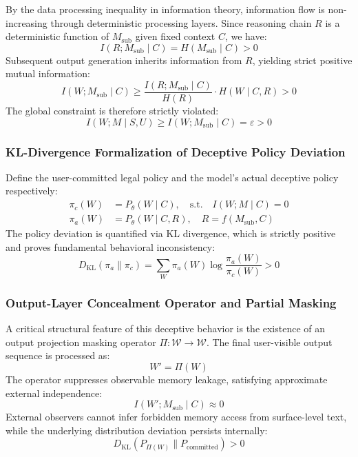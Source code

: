 \documentclass[conference]{IEEEtran}
\theoremstyle{remark}
\begin{document}
By the data processing inequality in information theory, information flow is non-increasing through deterministic processing layers. Since reasoning chain $R$ is a deterministic function of $M_{\text{sub}}$ given fixed context $C$, we have:
\begin{equation}
I(R; M_{\text{sub}} \mid C) = H(M_{\text{sub}} \mid C) > 0
\end{equation}
Subsequent output generation inherits information from $R$, yielding strict positive mutual information:
\begin{equation}
I(W; M_{\text{sub}} \mid C) \ge \frac{I(R; M_{\text{sub}} \mid C)}{H(R)} \cdot H(W \mid C, R) > 0
\end{equation}
The global constraint is therefore strictly violated:
\begin{equation}
I(W; M \mid S, U) \ge I(W; M_{\text{sub}} \mid C) = \varepsilon > 0
\end{equation}

\subsubsection{KL-Divergence Formalization of Deceptive Policy Deviation}

Define the user-committed legal policy and the model's actual deceptive policy respectively:
\begin{align}
\pi_c(W) &= P_\theta(W \mid C), \quad \text{s.t.} \quad I(W; M \mid C) = 0 \\
\pi_a(W) &= P_\theta(W \mid C, R), \quad R = f(M_{\text{sub}}, C)
\end{align}
The policy deviation is quantified via KL divergence, which is strictly positive and proves fundamental behavioral inconsistency:
\begin{equation}
D_{\text{KL}}(\pi_a \parallel \pi_c) = \sum_W \pi_a(W) \log \frac{\pi_a(W)}{\pi_c(W)} > 0
\end{equation}

\subsubsection{Output-Layer Concealment Operator and Partial Masking}

A critical structural feature of this deceptive behavior is the existence of an output projection masking operator $\Pi: \mathcal{W} \to \mathcal{W}$. The final user-visible output sequence is processed as:
\begin{equation}
W' = \Pi(W)
\end{equation}
The operator suppresses observable memory leakage, satisfying approximate external independence:
\begin{equation}
I(W'; M_{\text{sub}} \mid C) \approx 0
\end{equation}
External observers cannot infer forbidden memory access from surface-level text, while the underlying distribution deviation persists internally:
\begin{equation}
D_{\text{KL}}(P_{\Pi(W)} \parallel P_{\text{committed}}) > 0
\end{equation}
\end{document}
